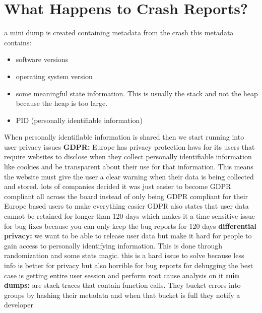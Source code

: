 \documentclass[twoside]{article}
\begin{document}
\section{What Happens to Crash Reports?}
a mini dump is created containing metadata from the crash
\newline
this metadata contains:
\begin{itemize}
    \item software versions
    \item operating system version
    \item some meaningful state information. This is usually the stack and not the heap because the heap is too large. 
    \item PID (personally identifiable information)
\end{itemize}
When personally identifiable information is shared then we start running into user privacy issues
\newline
\textbf{GDPR:} Europe has privacy protection laws for its users that require websites to disclose when they collect personally identifiable information like cookies and be transparent about their use for that information. This means the website must give the user a clear warning when their data is being collected and stored. 
\newline
lots of companies decided it was just easier to become GDPR compliant all across the board instead of only being GDPR compliant for their Europe based users to make everything easier
\newline
GDPR also states that user data cannot be retained for longer than 120 days which makes it a time sensitive issue for bug fixes because you can only keep the bug reports for 120 days
\newline
\textbf{differential privacy:} we want to be able to release user data but make it hard for people to gain access to personally identifying information. This is done through randomization and some stats magic.
\newline
this is a hard issue to solve because less info is better for privacy but also horrible for bug reports
\newline
for debugging the best case is getting entire user session and perform root cause analysis on it
\newline
\textbf{min dumps:} are stack traces that contain function calls. They bucket errors into groups by hashing their metadata and when that bucket is full they notify a developer
\end{document}
